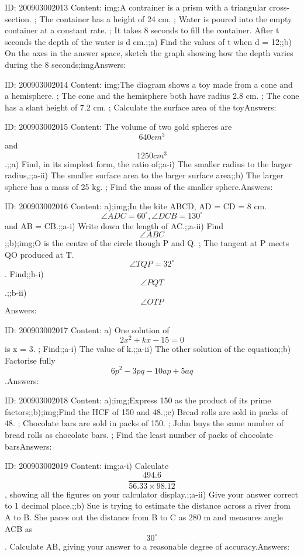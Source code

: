 \documentclass{article}
\begin{document}
ID: 200903002013
Content:
img;A contrainer is a prism with a triangular cross-section. ; The container has a height of 24 cm. ; Water is poured into the empty container at a constant rate. ; It takes 8 seconds to fill the container. After t seconds the depth of the water is d cm.;;a) Find the values of t when d = 12;;b) On the axes in the answer space, sketch the graph showing how the depth varies during the 8 seconds;imgAnswers:

ID: 200903002014
Content:
img;The diagram shows a toy made from a cone and a hemisphere. ; The cone and the hemisphere both have radius 2.8 cm. ; The cone has a slant height of 7.2 cm. ; Calculate the surface area of the toyAnswers:

ID: 200903002015
Content:
The volume of two gold spheres are $$640 cm^3$$ and $$1250 cm^3$$.;;a) Find, in its simplest form, the ratio of;;a-i) The smaller radius to the larger radius,;;a-ii) The smaller surface area to the larger surface area;;b) The larger sphere has a mass of 25 kg. ; Find the mass of the smaller sphere.Answers:

ID: 200903002016
Content:
a);img;In the kite ABCD, AD = CD = 8 cm. $$\angle ADC = 60^{\circ}, \angle DCB = 130^{\circ}$$ and AB = CB.;;a-i) Write down the length of AC.;;a-ii) Find $$\angle ABC$$;;b);img;O is the centre of the circle though P and Q. ; The tangent at P meets QO produced at T. $$\angle TQP = 32^{\circ}$$. Find;;b-i) $$\angle PQT$$.;;b-ii) $$\angle OTP$$Answers:

ID: 200903002017
Content:
a) One solution of $$2x^2 + kx - 15 = 0$$ is x = 3. ; Find;;a-i) The value of k.;;a-ii) The other solution of the equation;;b) Factorise fully $$6p^2 - 3pq - 10ap + 5aq$$.Answers:

ID: 200903002018
Content:
a);img;Express 150 as the product of its prime factors;;b);img;Find the HCF of 150 and 48.;;c) Bread rolls are sold in packs of 48. ; Chocolate bars are sold in packs of 150. ; John buys the same number of bread rolls as chocolate bars. ; Find the least number of packs of chocolate barsAnswers:

ID: 200903002019
Content:
img;a-i) Calculate $$\frac{494.6}{56.33 \times 98.12}$$, showing all the figures on your calculator display.;;a-ii) Give your answer correct to 1 decimal place.;;b) Sue is trying to estimate the distance across a river from A to B. She paces out the distance from B to C as 280 m and measures angle ACB as $$30^{\circ}$$. Calculate AB, giving your answer to a reasonable degree of accuracy.Answers:
\end{document}
